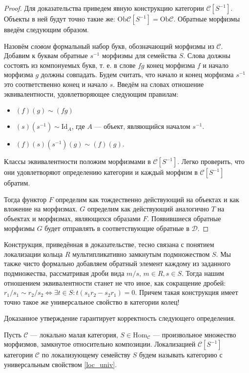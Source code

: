 \documentclass[../main.tex]{subfiles}
\begin{document}
\begin{proof}
  Для доказательства приведем явную конструкцию категории $\mathcal{C}[S^{-1}]$. 
  Объекты в ней будут точно такие же: $\text{Ob}\mathcal{C}[S^{-1}] = \text{Ob}\mathcal{C}$. 
  Обратные морфизмы введём следующим образом.

  Назовём \emph{словом} формальный набор букв, обозначающий морфизмы из $\mathcal{C}$. 
  Добавим к буквам обратные $s^{-1}$ морфизмы для семейства $S$. 
  Слова должны состоять из компонуемых букв, т. е. в слове $fg$ конец морфизма $f$ и начало морфизма $g$ должны совпадать. 
  Будем считать, что начало и конец морфизма $s^{-1}$ это соответственно конец и начало $s$. 
  Введём на словах отношение эквивалентности, удовлетворяющее следующим правилам:
  \begin{itemize}
    \item $(f)(g) \sim (fg)$
    \item $(s)(s^{-1}) \sim \text{Id}_{A}$, где $A$ --- объект, являющийся началом $s^{-1}$.
    \item $(f)(s)(s^{-1})(g) \sim (f)(g)$.
  \end{itemize}
  Классы эквивалентности положим морфизмами в $\mathcal{C}[S^{-1}]$. 
  Легко проверить, что они удовлетворяют определению категории и каждый морфизм в $\mathcal{C}[S^{-1}]$ обратим.

  Тогда функтор $F$ определим как тождественно действующий на объектах и как вложение на морфизмах. 
  $G$ определим как действующий аналогично $T$ на объектах и морфизмах, являющихся образами $F$. 
  Появившиеся обратные морфизмы $G$ будет отправлять в соответствующие обратные в $\mathcal{D}$.
\end{proof}

\begin{to_com}
  Конструкция, приведённая в доказательстве, тесно связана с понятием локализации кольца $R$ мультипликативно замкнутым подмножеством $S$. 
  Мы также чисто формально добавляем обратный элемент каждому из заданного подмножества, рассматривая дроби вида $m/s$, $m\in R, s\in S$. 
  Тогда нашим отношением эквивалентности станет не что иное, как сокращение дробей: $r_1/s_1\sim r_2/s_2 \iff \exists t\in S:t(s_1r_2 - s_2r_1)=0$. 
  Причем такая конструкция имеет точно такое же универсальное свойство в категории колец!
\end{to_com}

Доказанное утверждение гарантирует корректность следующего определения.
\begin{to_def}
  Пусть $\mathcal{C}$ --- локально малая категория, $S\in \text{Hom}_\mathcal{C}$ --- произвольное множество морфизмов, замкнутое относительно композиции. 
  Локализацией $\mathcal{C}[S^{-1}]$ категории $\mathcal{C}$ по локализующему семейству $S$ будем называть категорию с универсальным свойством \eqref{loc_univ}.
\end{to_def}
\end{document}
